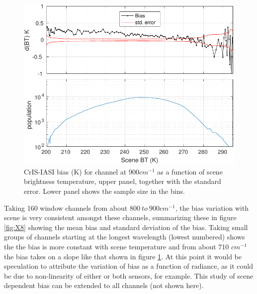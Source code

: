 \documentclass[twocolumn,10pt]{article}
\begin{document}
\begin{figure}[htb]
\centering
\includegraphics[width=\linewidth]{./figs/IC_jplSNO_Bias_stdErr_900wn_vsScene_quantile.pdf}
\caption{\label{fig:orgparagraph8}
  CrIS-IASI bias (K) for channel at $900 cm^{-1}$ as a function of scene brightness temperature, upper panel, together with the standard error. Lower panel shows the sample size in the bins.}
\label{fig:X7}
\end{figure}

Taking 160 window channels from about $800\ to\ 900 cm^{-1}$, the bias variation with scene
is very consistent amongst these channels, summarizing these in figure \ref{fig:X8} showing the mean bias and standard deviation of the bias. Taking small groups of channels starting at the longest wavelength (lowest numbered) shows the the bias is more constant with scene temperature and from about 710 \(cm^{-1}\) the bias takes on a slope like that shown in figure \ref{fig:X7}. At this point it would be speculation to attribute the variation of bias as a function of radiance, as it could be due to non-linearity of either or both sensors, for example. This study of scene dependent bias can be extended to all channels (not shown here).
\end{document}

